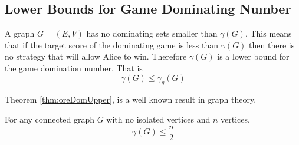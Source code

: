 \subsection{Lower Bounds for Game Dominating Number}
    
A graph $G=(E,V)$ has no dominating sets smaller than $\gamma(G)$. This means that if the target score of the dominating game is less than $\gamma(G)$ then there is no strategy that will allow Alice to win. Therefore $\gamma(G)$ is a lower bound for the game domination number. That is \[\gamma(G)\leq\gamma_g(G)\]


Theorem \ref{thm:oreDomUpper}, is a well known result in graph theory.   
\begin{theorem} \label{thm:oreDomUpper} 
    For any connected graph $G$ with no isolated vertices and $n$ vertices,     
    \[\gamma(G) \leq \frac{n}{2}\]
\end{theorem}

